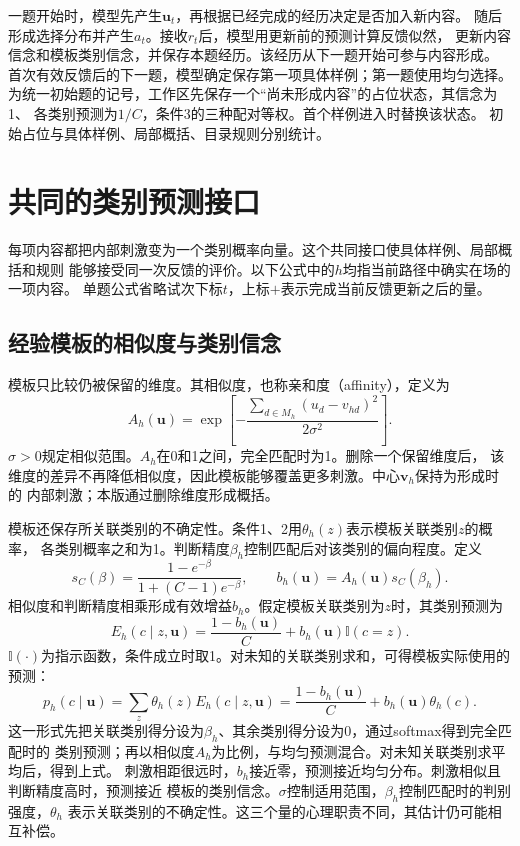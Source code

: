 \documentclass[11pt,a4paper]{article}
\numberwithin{equation}{section}
\newcommand{\ind}{\mathbb{I}}
\begin{document}
一题开始时，模型先产生$\bm u_t$，再根据已经完成的经历决定是否加入新内容。
随后形成选择分布并产生$a_t$。接收$r_t$后，模型用更新前的预测计算反馈似然，
更新内容信念和模板类别信念，并保存本题经历。该经历从下一题开始可参与内容形成。
首次有效反馈后的下一题，模型确定保存第一项具体样例；第一题使用均匀选择。
为统一初始题的记号，工作区先保存一个“尚未形成内容”的占位状态，其信念为1、
各类别预测为$1/C$，条件3的三种配对等权。首个样例进入时替换该状态。
初始占位与具体样例、局部概括、目录规则分别统计。

\section{共同的类别预测接口}
\label{sec:emission}

每项内容都把内部刺激变为一个类别概率向量。这个共同接口使具体样例、局部概括和规则
能够接受同一次反馈的评价。以下公式中的$h$均指当前路径中确实在场的一项内容。
单题公式省略试次下标$t$，上标$+$表示完成当前反馈更新之后的量。

\subsection{经验模板的相似度与类别信念}
模板只比较仍被保留的维度。其相似度，也称亲和度（affinity），定义为
\begin{equation}
A_h(\bm u)=\exp\!\left[-\frac{\sum_{d\in M_h}(u_d-v_{hd})^2}{2\sigma^2}\right].
\label{eq:affinity}
\end{equation}
$\sigma>0$规定相似范围。$A_h$在0和1之间，完全匹配时为1。删除一个保留维度后，
该维度的差异不再降低相似度，因此模板能够覆盖更多刺激。中心$\bm v_h$保持为形成时的
内部刺激；本版通过删除维度形成概括。

模板还保存所关联类别的不确定性。条件1、2用$\theta_h(z)$表示模板关联类别$z$的概率，
各类别概率之和为1。判断精度$\beta_h$控制匹配后对该类别的偏向程度。定义
\begin{equation}
s_C(\beta)=\frac{1-e^{-\beta}}{1+(C-1)e^{-\beta}},\qquad
b_h(\bm u)=A_h(\bm u)s_C(\beta_h).
\label{eq:gain}
\end{equation}
相似度和判断精度相乘形成有效增益$b_h$。假定模板关联类别为$z$时，其类别预测为
\begin{equation}
E_h(c\mid z,\bm u)=\frac{1-b_h(\bm u)}{C}+b_h(\bm u)\ind(c=z).
\label{eq:template-component}
\end{equation}
$\ind(\cdot)$为指示函数，条件成立时取1。对未知的关联类别求和，可得模板实际使用的预测：
\begin{equation}
p_h(c\mid\bm u)=\sum_z\theta_h(z)E_h(c\mid z,\bm u)
=\frac{1-b_h(\bm u)}{C}+b_h(\bm u)\theta_h(c).
\label{eq:template-prediction}
\end{equation}
这一形式先把关联类别得分设为$\beta_h$、其余类别得分设为0，通过softmax得到完全匹配时的
类别预测；再以相似度$A_h$为比例，与均匀预测混合。对未知关联类别求平均后，得到上式。
刺激相距很远时，$b_h$接近零，预测接近均匀分布。刺激相似且判断精度高时，预测接近
模板的类别信念。$\sigma$控制适用范围，$\beta_h$控制匹配时的判别强度，$\theta_h$
表示关联类别的不确定性。这三个量的心理职责不同，其估计仍可能相互补偿。
\end{document}
